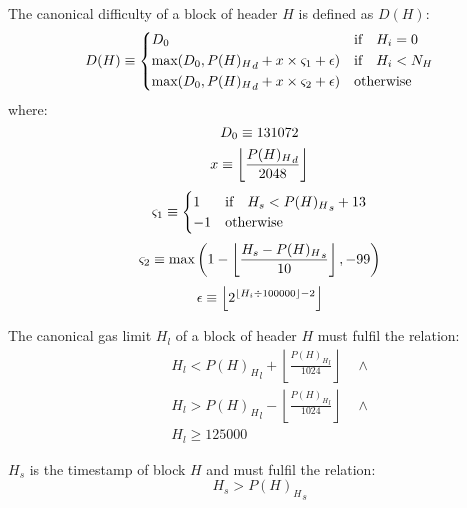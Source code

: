 \documentclass[UTF8,nofonts]{ctexart}
\newcommand{\firsthomesteadblock}{\ensuremath{N_H}}
\begin{document}
\begin{multicols}{2}
The canonical difficulty of a block of header $H$ is defined as $D(H)$:
\begin{equation}
D(H) \equiv \begin{dcases}
\mindifficulty & \text{if} \quad H_i = 0\\
\text{max}\!\left(\mindifficulty, {P(H)_H}_d + \diffadjustment\times\frontiermod + \expdiffsymb \right) & \text{if} \quad H_i<\firsthomesteadblock\\
\text{max}\!\left(\mindifficulty, {P(H)_H}_d + \diffadjustment\times\homesteadmod + \expdiffsymb \right) & \text{otherwise}\\
\end{dcases}
\end{equation}
where:
\begin{equation}
D_0 \equiv 131072
\end{equation}
\begin{equation}
x \equiv \left\lfloor\frac{{P(H)_H}_d}{2048}\right\rfloor
\end{equation}
\begin{equation}
\varsigma_1 \equiv \begin{cases}
1 & \text{if} \quad H_s < {P(H)_H}_s + 13 \\
-1 & \text{otherwise} \\
\end{cases}
\end{equation}
\begin{equation}
\varsigma_2 \equiv \text{max}\left( 1 - \left\lfloor\frac{H_s - {P(H)_H}_s}{10}\right\rfloor, -99 \right)
\end{equation}
\begin{equation}
\epsilon \equiv \left\lfloor 2^{ \left\lfloor H_i \div 100000 \right\rfloor - 2 } \right\rfloor
\end{equation}

The canonical gas limit $H_l$ of a block of header $H$ must fulfil the relation:
\begin{eqnarray}
& & H_l < {P(H)_H}_l + \left\lfloor\frac{{P(H)_H}_l}{1024}\right\rfloor \quad \wedge \\
& & H_l > {P(H)_H}_l - \left\lfloor\frac{{P(H)_H}_l}{1024}\right\rfloor \quad \wedge \\
& & H_l \geqslant 125000
\end{eqnarray}

$H_s$ is the timestamp of block $H$ and must fulfil the relation:
\begin{equation}
H_s > {P(H)_H}_s
\end{equation}


\end{multicols}
\end{document}
